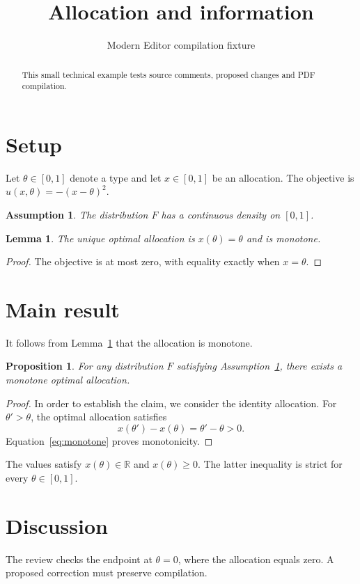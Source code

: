 \documentclass[11pt]{article}
\title{Allocation and information}
\author{Modern Editor compilation fixture}
\date{}
\newtheorem{assumption}{Assumption}
\newtheorem{lemma}{Lemma}
\newtheorem{proposition}{Proposition}
\begin{document}
\maketitle
\begin{abstract}
This small technical example tests source comments, proposed changes and PDF compilation.
\end{abstract}
\section{Setup}
Let $\theta\in[0,1]$ denote a type and let $x\in[0,1]$ be an allocation.
The objective is $u(x,\theta)=-(x-\theta)^2$.
\begin{assumption}\label{ass:regularity}
The distribution $F$ has a continuous density on $[0,1]$.
\end{assumption}
\begin{lemma}\label{lem:ordering}
The unique optimal allocation is $x(\theta)=\theta$ and is monotone.
\end{lemma}
\begin{proof}
The objective is at most zero, with equality exactly when $x=\theta$.
\end{proof}
\section{Main result}\label{sec:equilibrium}
It follows from Lemma~\ref{lem:ordering} that the allocation is monotone.
\begin{proposition}\label{prop:monotone}
For any distribution $F$ satisfying Assumption~\ref{ass:regularity}, there exists a monotone optimal allocation.
\end{proposition}
\begin{proof}
In order to establish the claim, we consider the identity allocation.
For $\theta'>\theta$, the optimal allocation satisfies
\begin{equation}\label{eq:monotone}
  x(\theta')-x(\theta)=\theta'-\theta>0.
\end{equation}
Equation~\eqref{eq:monotone} proves monotonicity.
\end{proof}
The values satisfy $x(\theta)\in\mathbb{R}$ and $x(\theta)\geq 0$.
The latter inequality is strict for every $\theta\in[0,1]$.
\section{Discussion}\label{sec:discussion}
The review checks the endpoint at $\theta=0$, where the allocation equals zero.
A proposed correction must preserve compilation.
\end{document}
